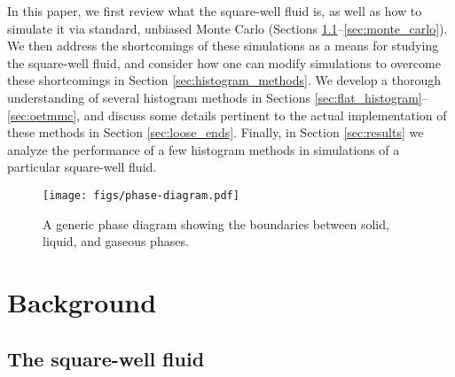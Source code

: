 \documentclass[11pt]{article}
\begin{document}
In this paper, we first review what the square-well fluid is, as well
as how to simulate it via standard, unbiased Monte Carlo (Sections
\ref{sec:sw_fluid}--\ref{sec:monte_carlo}). We then address the
shortcomings of these simulations as a means for studying the
square-well fluid, and consider how one can modify simulations to
overcome these shortcomings in Section \ref{sec:histogram_methods}. We
develop a thorough understanding of several histogram methods in
Sections \ref{sec:flat_histogram}--\ref{sec:oetmmc}, and discuss some
details pertinent to the actual implementation of these methods in
Section \ref{sec:loose_ends}. Finally, in Section \ref{sec:results} we
analyze the performance of a few histogram methods in simulations of a
particular square-well fluid.

\begin{figure}[!b]
  \centering
  \texttt{[image: figs/phase-diagram.pdf]}
  \caption[Phase diagram]
  {A generic phase diagram showing the boundaries between solid,
    liquid, and gaseous phases.}
  \label{fig:phase_diagram}
\end{figure}


\section{Background}
\label{sec:background}

\subsection{The square-well fluid}
\label{sec:sw_fluid}
\end{document}
